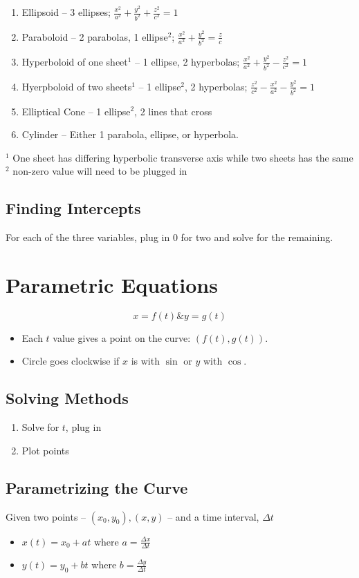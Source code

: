 \documentclass[12pt]{article}
\begin{document}
\begin{enumerate}
    \item Ellipsoid -- 3 ellipses; $\frac{x^2}{a^2}+\frac{y^2}{b^2}+\frac{z^2}{c^2}=1$
    \item Paraboloid -- 2 parabolas, 1 ellipse$^2$; $\frac{x^2}{a^2}+\frac{y^2}{b^2}=\frac{z}{c}$
    \item Hyperboloid of one sheet$^1$ -- 1 ellipse, 2 hyperbolas; $\frac{x^2}{a^2}+\frac{y^2}{b^2}-\frac{z^2}{c^2}=1$
    \item Hyerpboloid of two sheets$^1$ -- 1 ellipse$^2$, 2 hyperbolas; $\frac{z^2}{c^2}-\frac{x^2}{a^2}-\frac{y^2}{b^2}=1$
    \item Elliptical Cone -- 1 ellipse$^2$, 2 lines that cross
    \item Cylinder -- Either 1 parabola, ellipse, or hyperbola.
\end{enumerate}
$^1$ One sheet has differing hyperbolic transverse axis while two sheets has the same
\newline
$^2$ non-zero value will need to be plugged in

\subsection{Finding Intercepts}
For each of the three variables, plug in $0$ for two and solve for the remaining.

\section{Parametric Equations}
$$x=f(t) \& y=g(t)$$
\begin{itemize}
    \item Each $t$ value gives a point on the curve: $(f(t),g(t))$. 
    \item Circle goes clockwise if $x$ is with $\sin$ or $y$ with $\cos$. 
\end{itemize}

\subsection{Solving Methods}
\begin{enumerate}
    \item Solve for $t$, plug in
    \item Plot points
\end{enumerate}

\subsection{Parametrizing the Curve}
Given two points -- $(x_0,y_0), (x,y)$ -- and a time interval, $\Delta t$
\begin{itemize}
    \item $x(t)=x_0 + at$ where $a=\frac{\Delta x}{\Delta t}$
    \item $y(t)=y_0 + bt$ where $b=\frac{\Delta y}{\Delta t}$
\end{itemize}
\end{document}

